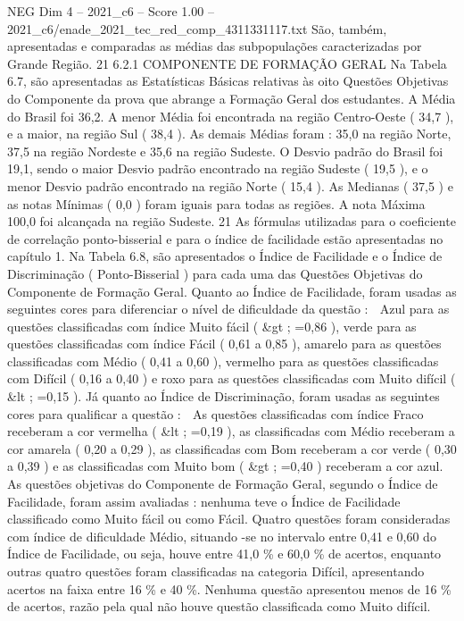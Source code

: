 \begin{textsample}{NEG Dim 4 – 2021\_c6 – Score 1.00 – 2021\_c6/enade\_2021\_tec\_red\_comp\_4311331117.txt}
São, também, apresentadas e comparadas as médias das subpopulações caracterizadas por Grande Região. 21 6.2.1 COMPONENTE DE FORMAÇÃO GERAL Na Tabela 6.7, são apresentadas as Estatísticas Básicas relativas às oito Questões Objetivas do Componente da prova que abrange a Formação Geral dos estudantes.
A Média do Brasil foi 36,2.
A menor Média foi encontrada na região Centro-Oeste ( 34,7 ), e a maior, na região Sul ( 38,4 ).
As demais Médias foram : 35,0 na região Norte, 37,5 na região Nordeste e 35,6 na região Sudeste.
O Desvio padrão do Brasil foi 19,1, sendo o maior Desvio padrão encontrado na região Sudeste ( 19,5 ), e o menor Desvio padrão encontrado na região Norte ( 15,4 ).
As Medianas ( 37,5 ) e as notas Mínimas ( 0,0 ) foram iguais para todas as regiões.
A nota Máxima 100,0 foi alcançada na região Sudeste. 21 As fórmulas utilizadas para o coeficiente de correlação ponto-bisserial e para o índice de facilidade estão apresentadas no capítulo 1.
Na Tabela 6.8, são apresentados o Índice de Facilidade e o Índice de Discriminação ( Ponto-Bisserial ) para cada uma das Questões Objetivas do Componente de Formação Geral.
Quanto ao Índice de Facilidade, foram usadas as seguintes cores para diferenciar o nível de dificuldade da questão :  Azul para as questões classificadas com índice Muito fácil ( \&gt ; =0,86 ), verde para as questões classificadas com índice Fácil ( 0,61 a 0,85 ), amarelo para as questões classificadas com Médio ( 0,41 a 0,60 ), vermelho para as questões classificadas com Difícil ( 0,16 a 0,40 ) e roxo para as questões classificadas com Muito difícil ( \&lt ; =0,15 ).
Já quanto ao Índice de Discriminação, foram usadas as seguintes cores para qualificar a questão :  As questões classificadas com índice Fraco receberam a cor vermelha ( \&lt ; =0,19 ), as classificadas com Médio receberam a cor amarela ( 0,20 a 0,29 ), as classificadas com Bom receberam a cor verde ( 0,30 a 0,39 ) e as classificadas com Muito bom ( \&gt ; =0,40 ) receberam a cor azul.
As questões objetivas do Componente de Formação Geral, segundo o Índice de Facilidade, foram assim avaliadas : nenhuma teve o Índice de Facilidade classificado como Muito fácil ou como Fácil.
Quatro questões foram consideradas com índice de dificuldade Médio, situando -se no intervalo entre 0,41 e 0,60 do Índice de Facilidade, ou seja, houve entre 41,0 \% e 60,0 \% de acertos, enquanto outras quatro questões foram classificadas na categoria Difícil, apresentando acertos na faixa entre 16 \% e 40 \%.
Nenhuma questão apresentou menos de 16 \% de acertos, razão pela qual não houve questão classificada como Muito difícil.

\end{textsample}
